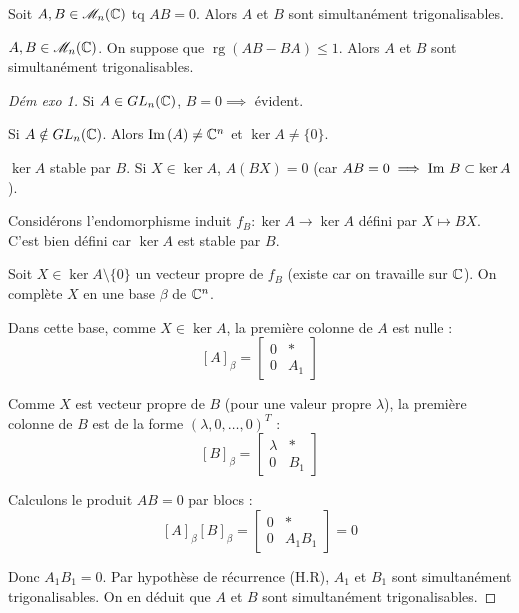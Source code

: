 \lvspace
{} Soit $A, B \in \mathscr M_n(\mathbb{C})$ tq $AB = 0$. Alors $A$ et $B$ sont simultanément trigonalisables.

 $A, B \in \mathscr M_n(\mathbb{C})$. On suppose que $\operatorname{rg}(AB - BA) \leqslant 1$.
Alors $A$ et $B$ sont simultanément trigonalisables.


\begin{proof}[Dém exo 1]
    Si $A \in GL_n(\mathbb{C})$, $B = 0 \implies$ évident.
    
    Si $A \notin GL_n(\mathbb{C})$. Alors $\operatorname{Im} \,(A) \neq \mathbb{C}^n$ et $\ker A \neq \{0\}$.
    
     $\ker A$ stable par $B$.
    Si $X \in \ker A$, $A(BX) = 0$ (car $AB=0 \implies \operatorname{Im} \, B \subset \ker A$).

Considérons l'endomorphisme induit $f_B : \ker A \to \ker A$ défini par $X \mapsto BX$.
C'est bien défini car $\ker A$ est stable par $B$.

Soit $X \in \ker A \setminus \{0\}$ un vecteur propre de $f_B$ (existe car on travaille sur $\mathbb{C}$).
On complète $X$ en une base $\beta$ de $\mathbb{C}^n$.

Dans cette base, comme $X \in \ker A$, la première colonne de $A$ est nulle :
\[ [A]_\beta = \left[ \begin{array}{c|c} 0 & * \\ \hline 0 & A_1 \end{array} \right] \]

Comme $X$ est vecteur propre de $B$ (pour une valeur propre $\lambda$), la première colonne de $B$ est de la forme $(\lambda, 0, \dots, 0)^T$ :
\[ [B]_\beta = \left[ \begin{array}{c|c} \lambda & * \\ \hline 0 & B_1 \end{array} \right] \]

Calculons le produit $AB = 0$ par blocs :
\[ [A]_\beta [B]_\beta = \left[ \begin{array}{c|c} 0 & * \\ \hline 0 & A_1 B_1 \end{array} \right] = 0 \]

Donc $A_1 B_1 = 0$.
Par hypothèse de récurrence (H.R), $A_1$ et $B_1$ sont simultanément trigonalisables.
On en déduit que $A$ et $B$ sont simultanément trigonalisables.
\end{proof}